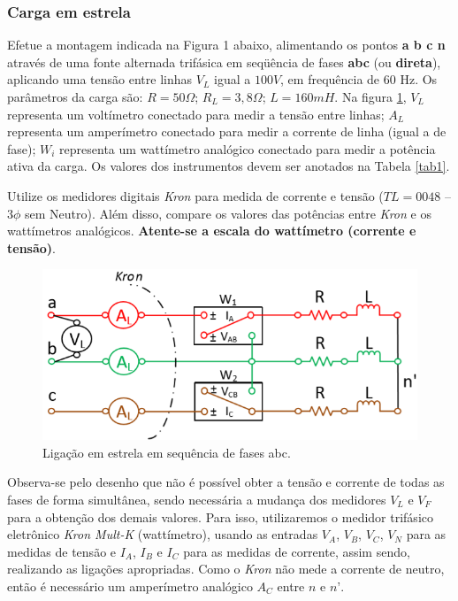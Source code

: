 \documentclass[a4paper,12pt,oneside,openany,table,xcdraw]{article}
\begin{document}
\subsubsection{Carga em estrela}
 Efetue a montagem indicada na Figura 1 abaixo, alimentando os pontos \textbf{a b c n} através de uma fonte alternada trifásica em seqüência de fases \textbf{abc} (ou \textbf{direta}), aplicando uma tensão entre linhas $V_L$ igual a $100 V$, em frequência de 60 Hz. Os parâmetros da carga são: $R = 50 \Omega$; $R_L = 3,8\Omega$; $L = 160 mH$. Na figura \ref{fig1}, $V_L$ representa um voltímetro conectado para medir a tensão entre linhas; $A_L$ representa um amperímetro conectado para medir a corrente de linha (igual a de fase); $W_i$ representa um wattímetro analógico conectado para medir a potência ativa da carga. Os valores dos instrumentos devem ser anotados na Tabela \ref{tab1}.  

Utilize os medidores digitais \emph{Kron} para medida de corrente e tensão ($TL = 0048$ – $3\phi$ sem Neutro). Além disso, compare os valores das potências entre \emph{Kron} e os wattímetros analógicos. \textbf{Atente-se a escala do wattímetro (corrente e tensão)}. 
\begin{figure}[H]
\centering
\captionsetup{font=scriptsize}
\includegraphics[width=14cm]{fig1}
\caption{Ligação em estrela em sequência de fases abc.}
\label{fig1}
\end{figure}
Observa-se pelo desenho que não é possível obter a tensão e corrente de todas as fases de forma simultânea, sendo necessária a mudança dos medidores $V_L$ e $V_F$ para a obtenção dos demais valores. Para isso, utilizaremos o medidor trifásico eletrônico \textit{Kron Mult-K} (wattímetro),  usando as entradas $V_A$, $V_B$, $V_C$, $V_N$ para as medidas de tensão e $I_A$, $I_B$ e $I_C$ para as medidas de corrente, assim sendo, realizando as ligações apropriadas. Como o \textit{Kron} não mede a corrente de neutro, então é necessário um amperímetro analógico $A_C$ entre $n$ e $n’$.
\end{document}
